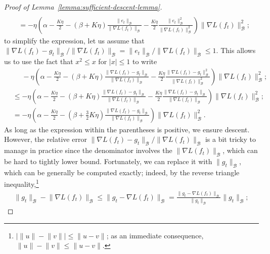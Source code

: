 \documentclass{article}
\newcommand{\B}{\mathcal{B}}
\begin{document}
\begin{proof}[Proof of Lemma~\ref{lemma:sufficient-descent-lemma}]
\begin{align*}
        \\ &= -\eta \left( \alpha - \frac{K\eta}{2} - (\beta + K\eta) \frac{\lVert e_t \rVert_\B}{\lVert \nabla L(f_t) \rVert_\B} - \frac{K\eta}{2} \frac{\lVert e_t \rVert_\B^2}{\lVert \nabla L(f_t) \rVert_\B^2} \right) \lVert \nabla L(f_t) \rVert_\B^2;
    \end{align*}
    to simplify the expression, let us assume that ${\lVert \nabla L(f_t) - g_t \rVert_\B}/{\lVert \nabla L(f_t) \rVert_\B} = {\lVert e_t \rVert_\B}/{\lVert \nabla L(f_t) \rVert_\B} \leq 1$. This allows us to use the fact that $x^2 \leq x$ for $\lvert x \rvert \leq 1$ to write
    \begin{align*}
        &\mathrel{\phantom{=}} -\eta \left( \alpha - \frac{K\eta}{2} - (\beta + K\eta) \frac{\lVert \nabla L(f_t) - g_t \rVert_\B}{\lVert \nabla L(f_t) \rVert_\B} - \frac{K\eta}{2} \frac{\lVert \nabla L(f_t) - g_t \rVert_\B^2}{\lVert \nabla L(f_t) \rVert_\B^2} \right) \lVert \nabla L(f_t) \rVert_\B^2;
        \\ &\leq -\eta \left( \alpha - \frac{K\eta}{2} - (\beta + K\eta) \frac{\lVert \nabla L(f_t) - g_t \rVert_\B}{\lVert \nabla L(f_t) \rVert_\B} - \frac{K\eta}{2} \frac{\lVert \nabla L(f_t) - g_t \rVert_\B}{\lVert \nabla L(f_t) \rVert_\B} \right) \lVert \nabla L(f_t) \rVert_\B^2;
        \\ &= -\eta \left( \alpha - \frac{K\eta}{2} - \left(\beta + \frac{3}{2} K\eta\right) \frac{\lVert \nabla L(f_t) - g_t \rVert_\B}{\lVert \nabla L(f_t) \rVert_\B} \right) \lVert \nabla L(f_t) \rVert_\B^2.
    \end{align*}
    As long as the expression within the parentheses is positive, we ensure descent.
    However, the relative error ${\lVert \nabla L(f_t) - g_t \rVert_\B}/{\lVert \nabla L(f_t) \rVert_\B}$ is a bit tricky to manage in practice since the denominator involves the $\lVert \nabla L(f_t) \rVert_\B$, which can be hard to tightly lower bound.
    Fortunately, we can replace it with $\lVert g_t \rVert_\B$, which can be generally be computed exactly; indeed, by the reverse triangle inequality,\footnote{$\bigl\lvert \lVert u \rVert - \lVert v \rVert \bigr\rvert \leq \lVert u - v \rVert$; as an immediate consequence, $\lVert u \rVert - \lVert v \rVert \leq \lVert u - v \rVert$.}
    \begin{align*}
        \lVert g_t \rVert_\B - \lVert \nabla L(f_t) \rVert_\B
        \leq \lVert g_t - \nabla L(f_t) \rVert_\B
        = \frac{\lVert g_t - \nabla L(f_t) \rVert_\B}{\lVert g_t \rVert_\B} \lVert g_t \rVert_\B;
    \end{align*}

\end{proof}
\end{document}
